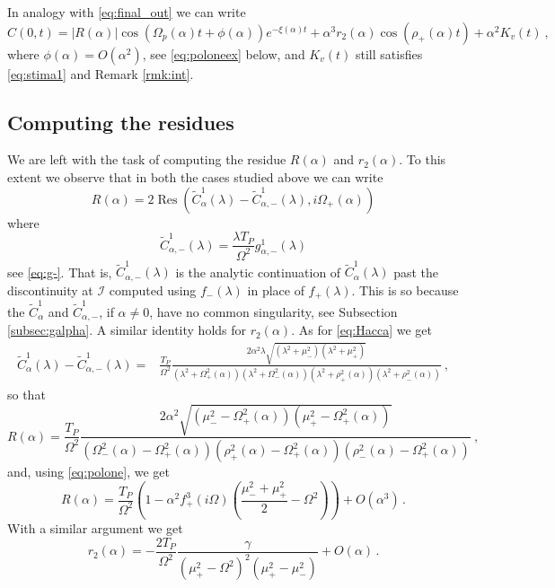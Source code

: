 \documentclass[11pt]{article}
\numberwithin{equation}{section}
\DeclareMathOperator{\Res}{Res}
\numberwithin{theorem}{section}
\def\tilde#1{\widetilde{#1}}
\begin{document}
In analogy with \eqref{eq:final_out} we can write
\begin{equation}\label{eq:final_in}
C(0,t)=|R(\alpha)|\cos(\Omega_p(\alpha)t+\phi(\alpha)) e^{-\xi(\alpha)t} +
\alpha^3 r_2(\alpha)\cos(\rho_+(\alpha)t)+\alpha^2 K_{v}(t)\ ,
\end{equation}
where $\phi(\alpha)=O(\alpha^2)$, see \eqref{eq:poloneex} below, and $K_{v}(t)$ still satisfies \eqref{eq:stima1} and
Remark \ref{rmk:int}.


\subsection{Computing the residues}\label{subsec:comp}

We are left with the task of computing the residue $R(\alpha)$ and $r_2(\alpha)$. To this extent we observe that in both
the cases studied above we can write
\[
 R(\alpha)=2\Res(\tilde C^1_{\alpha}(\lambda)-\tilde C^1_{\alpha,-}(\lambda),i\Omega_+(\alpha))
\]
where
\[
\tilde C^1_{\alpha,-}(\lambda)=\frac{\lambda T_P}{\Omega^2}
g^1_{\alpha,-}(\lambda)
\]
see \eqref{eq:g-}. That is, $\tilde C^1_{\alpha,-}(\lambda)$ is the analytic continuation of $\tilde
C^1_{\alpha}(\lambda)$ past the discontinuity at $\mathcal I$ computed using $f_-(\lambda)$ in place of $f_+(\lambda)$.
This is so because the $\tilde C^1_{\alpha}$ and $\tilde C^1_{\alpha,-}$, if $\alpha\not=0$, have no common singularity,
see Subsection \ref{subsec:galpha}. A similar identity holds for $r_2(\alpha)$. As for \eqref{eq:Hacca} we get
\[
\begin{aligned}
 \tilde C^1_\alpha(\lambda)-\tilde C^1_{\alpha,-}(\lambda)=
&\frac{T_P}{\Omega^2}\frac{2\alpha^2
\lambda\sqrt{(\lambda^2+\mu_-^2)(\lambda^2+\mu_+^2)}}{(\lambda^2+\Omega^2_+(\alpha))
(\lambda^2+\Omega^2_-(\alpha))(\lambda^2+\rho^2_+(\alpha))
(\lambda^2+\rho^2_-(\alpha))}\ ,
\end{aligned}
\]
so that
\[
R(\alpha)=\frac{T_P}{\Omega^2}
\frac{2\alpha^2\sqrt{(\mu_-^2-\Omega^2_+(\alpha))(\mu_+^2-
    \Omega^2_+(\alpha))}}{
(\Omega^2_-(\alpha)-\Omega^2_+(\alpha))(\rho^2_+(\alpha)-\Omega^2_+(\alpha))
(\rho^2_-(\alpha)-\Omega^2_+(\alpha))}\ ,
\]
and, using \eqref{eq:polone}, we get
\begin{equation}\label{eq:poloneex}
 R(\alpha)=\frac{T_P}{\Omega^2}\left(1-\alpha^2f_+^3(i\Omega)\left(\frac{\mu_-^2+
 \mu_+^2}2-\Omega^2\right)\right)+O(\alpha^3)\, .
\end{equation}
With a similar argument we get
\[
 r_2(\alpha)=-\frac{2T_P}{\Omega^2}\frac{\gamma}{\left(\mu_+^2-\Omega^2\right)^2(\mu_+^2-\mu_-^2)}+O(\alpha)\,.
\]
\end{document}
